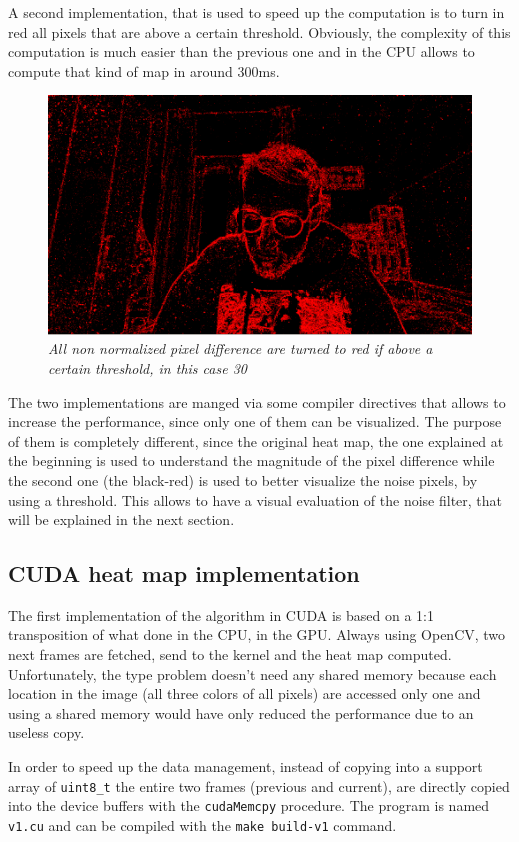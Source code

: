\documentclass[paper=a4, fontsize=10pt]{scrartcl}	%
\begin{document}
	A second implementation, that is used to speed up the computation is to turn in red all pixels that are above a certain threshold. Obviously, the complexity of this computation is much easier than the previous one and in the CPU allows to compute that kind of map in around 300ms.
	\begin{figure}[H]
		\centering
		\includegraphics[width=0.4\linewidth]{images/heatmap/v0-red}
		\caption{\textit{All non normalized pixel difference are turned to red if above a certain threshold, in this case 30}}
		\label{fig:v0-red}
	\end{figure}

	The two implementations are manged via some compiler directives that allows to increase the performance, since only one of them can be visualized. The purpose of them is completely different, since the original heat map, the one explained at the beginning is used to understand the magnitude of the pixel difference while the second one (the black-red) is used to better visualize the noise pixels, by using a threshold. This allows to have a visual evaluation of the noise filter, that will be explained in the next section.
	
	\subsection{CUDA heat map implementation}
	The first implementation of the algorithm in CUDA is based on a 1:1 transposition of what done in the CPU, in the GPU. Always using OpenCV, two next frames are fetched, send to the kernel and the heat map computed.\newline\newline
	Unfortunately, the type problem doesn't need any shared memory because each location in the image (all three colors of all pixels) are accessed only one and using a shared memory would have only reduced the performance due to an useless copy.
	
	In order to speed up the data management, instead of copying into a support array of \texttt{uint8\_t} the entire two frames (previous and current), are directly copied into the device buffers with the \texttt{cudaMemcpy} procedure. The program is named \texttt{v1.cu} and can be compiled with the \texttt{make build-v1} command.
	
\end{document}
